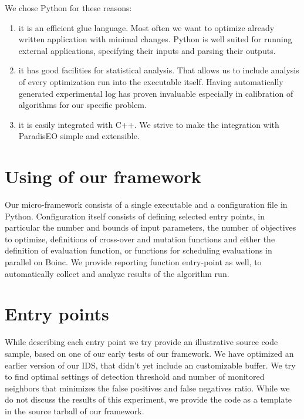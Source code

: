 \documentclass[12pt,oneside]{fithesis2}
\begin{document}
We chose Python for these reasons:
\begin{enumerate}
\item it is an efficient glue language. 
Most often we want to optimize already written application with minimal changes. Python is well suited for running external applications, specifying their inputs and parsing their outputs.
 
\item it has good facilities for statistical analysis.
That allows us to include analysis of every optimization run into the executable itself. Having automatically generated experimental log has proven invaluable especially in calibration of algorithms for our specific problem.

\item it is easily integrated with C++.
We strive to make the integration with ParadisEO simple and extensible. 
\end{enumerate}

\section{Using of our framework}

Our micro-framework consists of a single executable and a configuration file in Python. Configuration itself consists of defining selected entry points, in particular the number and bounds of input parameters, the number of objectives to optimize, definitions of cross-over and mutation functions and either the definition of evaluation function, or functions for scheduling evaluations in parallel on Boinc. We provide reporting function entry-point as well, to automatically collect and analyze results of the algorithm run.

\section{Entry points}

While describing each entry point we try provide an illustrative  source code sample, based on one of our early tests of our framework. We have optimized an earlier version of our IDS, that didn't yet include an customizable buffer. We try to find optimal settings of detection threshold and number of monitored neighbors that minimizes the false positives and false negatives ratio. While we do not discuss the results of this experiment, we provide the code as a template in the source tarball of our framework\cite{tarball}.
\end{document}

